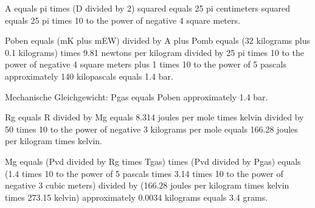 A equals pi times (D divided by 2) squared equals 25 pi centimeters squared equals 25 pi times 10 to the power of negative 4 square meters.

Poben equals (mK plus mEW) divided by A plus Pomb equals (32 kilograms plus 0.1 kilograms) times 9.81 newtons per kilogram divided by 25 pi times 10 to the power of negative 4 square meters plus 1 times 10 to the power of 5 pascals approximately 140 kilopascals equals 1.4 bar.

Mechanische Gleichgewicht: Pgas equals Poben approximately 1.4 bar.

Rg equals R divided by Mg equals 8.314 joules per mole times kelvin divided by 50 times 10 to the power of negative 3 kilograms per mole equals 166.28 joules per kilogram times kelvin.

Mg equals (Pvd divided by Rg times Tgas) times (Pvd divided by Pgas) equals (1.4 times 10 to the power of 5 pascals times 3.14 times 10 to the power of negative 3 cubic meters) divided by (166.28 joules per kilogram times kelvin times 273.15 kelvin) approximately 0.0034 kilograms equals 3.4 grams.